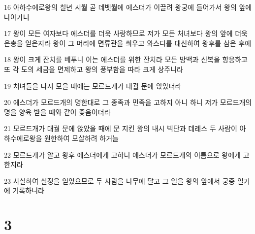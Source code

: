 \par 16 아하수에로왕의 칠년 시월 곧 데벳월에 에스더가 이끌려 왕궁에 들어가서 왕의 앞에 나아가니
\par 17 왕이 모든 여자보다 에스더를 더욱 사랑하므로 저가 모든 처녀보다 왕의 앞에 더욱 은총을 얻은지라 왕이 그 머리에 면류관을 씌우고 와스디를 대신하여 왕후를 삼은 후에
\par 18 왕이 크게 잔치를 베푸니 이는 에스더를 위한 잔치라 모든 방백과 신복을 향응하고 또 각 도의 세금을 면제하고 왕의 풍부함을 따라 크게 상주니라
\par 19 처녀들을 다시 모을 때에는 모르드개가 대궐 문에 앉았더라
\par 20 에스더가 모르드개의 명한대로 그 종족과 민족을 고하지 아니 하니 저가 모르드개의 명을 양육 받을 때와 같이 좇음이더라
\par 21 모르드개가 대궐 문에 앉았을 때에 문 지킨 왕의 내시 빅단과 데레스 두 사람이 아하수에로왕을 원한하여 모살하려 하거늘
\par 22 모르드개가 알고 왕후 에스더에게 고하니 에스더가 모르드개의 이름으로 왕에게 고한지라
\par 23 사실하여 실정을 얻었으므로 두 사람을 나무에 달고 그 일을 왕의 앞에서 궁중 일기에 기록하니라

\chapter{3}

